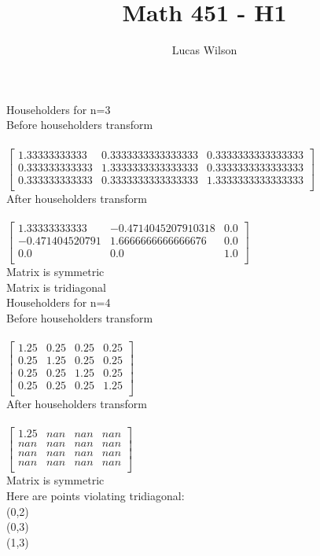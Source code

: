 \documentclass[12pt]{article}
\newenvironment{problem}[2][Problem]{\begin{trivlist}
\item[\hskip \labelsep {\bfseries #1}\hskip \labelsep {\bfseries #2.}]}{\end{trivlist}}
\begin{document}
 
\title{Math 451 - H1}
\author{Lucas Wilson}
\maketitle
 
\begin{problem}{1}
\end{problem}

Householders for n=3 \\
Before householders transform \\
\\
$
\left[ {\begin{array}{ccc}
1.33333333333 & 0.3333333333333333 & 0.3333333333333333 \\
0.333333333333 & 1.3333333333333333 & 0.3333333333333333 \\
0.333333333333 & 0.3333333333333333 & 1.3333333333333333 \\
\end{array} } \right]
$
\\
After householders transform \\
\\
$
\left[ {\begin{array}{ccc}
1.33333333333 & -0.4714045207910318 & 0.0 \\
-0.471404520791 & 1.6666666666666676 & 0.0 \\
0.0 & 0.0 & 1.0 \\
\end{array} } \right]
$
\\
Matrix is symmetric \\
Matrix is tridiagonal \\
Householders for n=4 \\
Before householders transform \\
\\
$
\left[ {\begin{array}{cccc}
1.25 & 0.25 & 0.25 & 0.25 \\
0.25 & 1.25 & 0.25 & 0.25 \\
0.25 & 0.25 & 1.25 & 0.25 \\
0.25 & 0.25 & 0.25 & 1.25 \\
\end{array} } \right]
$
\\
After householders transform \\
\\
$
\left[ {\begin{array}{cccc}
1.25 & nan & nan & nan \\
nan & nan & nan & nan \\
nan & nan & nan & nan \\
nan & nan & nan & nan \\
\end{array} } \right]
$
\\
Matrix is symmetric \\
Here are points violating tridiagonal: \\
(0,2) \\
(0,3) \\
(1,3) \\
\end{document}

